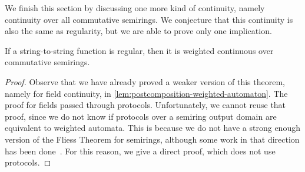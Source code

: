 We finish this section by discussing one more kind of continuity, namely continuity over all commutative semirings. We conjecture that this continuity is also the same as regularity, but we are able to prove only one implication.
\label{sec:commutative-semirings}
\begin{theorem}\label{thm:regular-continuous-commutative-semirings}
    If a string-to-string function is  regular, then it is weighted continuous over commutative semirings.
\end{theorem}
\begin{proof}
    Observe that we have already proved a weaker version of this theorem, namely for field continuity, in \cref{lem:postcomposition-weighted-automaton}. The proof for fields passed through protocols. Unfortunately, we cannot reuse that proof, since we do not know if protocols over a semiring output domain are equivalent to weighted automata. This is because we do not have a strong enough version of the Fliess Theorem for semirings, although some work in that direction has been done~\cite[Corollary 2.15]{daviaud25}. For this reason, we give a direct proof, which does not use protocols. 


\end{proof}
